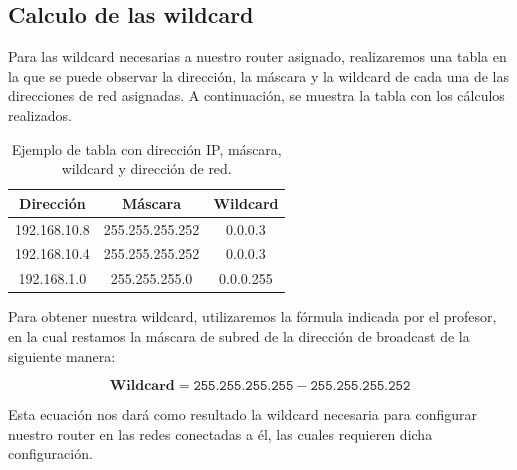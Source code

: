     \subsection{Calculo de las wildcard}
    Para las wildcard necesarias a nuestro router asignado, realizaremos una tabla en la que se puede observar la dirección, la máscara y la wildcard de cada una de las direcciones de red asignadas. A continuación, se muestra la tabla con los cálculos realizados.
        \begin{table}[H]
            \centering
            \begin{tabular}{c|c|c}
                \textbf{Dirección} & \textbf{Máscara} & \textbf{Wildcard} \\
                \hline
                192.168.10.8 & 255.255.255.252 & 0.0.0.3 \\
                192.168.10.4 & 255.255.255.252 & 0.0.0.3  \\
                192.168.1.0 & 255.255.255.0 & 0.0.0.255 \\
            \end{tabular}
            \caption{Ejemplo de tabla con dirección IP, máscara, wildcard y dirección de red.}
        \end{table}
        Para obtener nuestra wildcard, utilizaremos la fórmula indicada por el profesor, en la cual restamos la máscara de subred de la dirección de broadcast de la siguiente manera:

        \begin{equation}
            \textbf{Wildcard} = \texttt{255.255.255.255} - \texttt{255.255.255.252}
           \end{equation}
        
        Esta ecuación nos dará como resultado la wildcard necesaria para configurar nuestro router en las redes conectadas a él, las cuales requieren dicha configuración.
